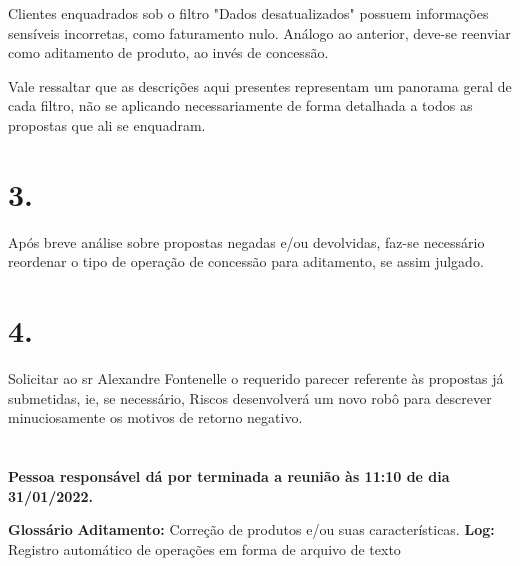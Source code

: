 \documentclass[a4paper, 11pt]{article}
\begin{document}
Clientes enquadrados sob o filtro "Dados desatualizados" possuem informações sensíveis incorretas, como faturamento nulo. Análogo ao anterior, deve-se reenviar como aditamento de produto, ao invés de concessão.

Vale ressaltar que as descrições aqui presentes representam um panorama geral de cada filtro, não se aplicando necessariamente de forma detalhada a todos as propostas que ali se enquadram. 


\section*{3. }
Após breve análise sobre propostas negadas e/ou devolvidas, faz-se necessário reordenar o tipo de operação de concessão para aditamento, se assim julgado.





\section*{4.} Solicitar ao sr Alexandre Fontenelle o requerido parecer referente às propostas já submetidas, ie, se necessário, Riscos desenvolverá um novo robô para descrever minuciosamente os motivos de retorno negativo.

 
 \section*{}
\textbf{Pessoa responsável dá por terminada a reunião às 11:10 de dia 31/01/2022.}

\setlength{\textwidth}{14cm}\textbf{Glossário}
\textbf{Aditamento:} Correção de produtos e/ou suas características.
\textbf{Log:} Registro automático de operações em forma de arquivo de texto




\end{document}
